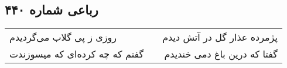\begin{center}
\section*{رباعی شماره ۴۴۰}
\label{sec:sh440}
\begin{longtable}{l p{0.5cm} r}
روزی ز پی گلاب می‌گردیدم
&&
پژمرده عذار گل در آتش دیدم
\\
گفتم که چه کرده‌ای که میسوزندت
&&
گفتا که درین باغ دمی خندیدم
\\
\end{longtable}
\end{center}
